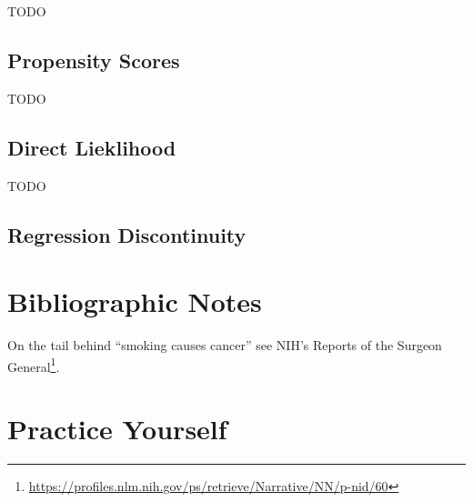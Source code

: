 \documentclass[]{book}
\renewcommand{\href}[2]{#2\footnote{\url{#1}}}
\theoremstyle{definition}
\theoremstyle{definition}
\theoremstyle{definition}
\theoremstyle{remark}
\begin{document}
TODO

\hypertarget{propensity-scores}{%
\subsection{Propensity Scores}\label{propensity-scores}}

TODO

\hypertarget{direct-lieklihood}{%
\subsection{Direct Lieklihood}\label{direct-lieklihood}}

TODO

\hypertarget{regression-discontinuity}{%
\subsection{Regression Discontinuity}\label{regression-discontinuity}}

\hypertarget{bibliographic-notes-15}{%
\section{Bibliographic Notes}\label{bibliographic-notes-15}}

On the tail behind ``smoking causes cancer'' see \href{https://profiles.nlm.nih.gov/ps/retrieve/Narrative/NN/p-nid/60}{NIH's Reports of the Surgeon General}.

\hypertarget{practice-yourself-13}{%
\section{Practice Yourself}\label{practice-yourself-13}}


\end{document}
